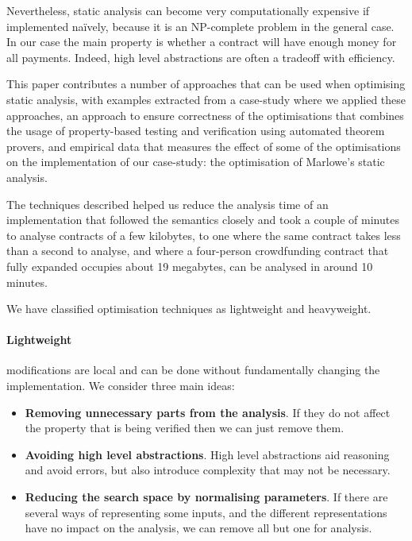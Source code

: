 \documentclass[english,runningheads]{llncs}
\begin{document}
Nevertheless, static analysis can become very computationally expensive if
implemented naïvely, because it is an NP-complete problem in the general case.
In our case the main property is whether a contract will have enough money for all payments. Indeed, high level abstractions are often a tradeoff with efficiency.


This paper contributes a number of approaches that can be used when
optimising static analysis, with examples extracted from a case-study where
we applied these approaches, an approach to ensure correctness
of the optimisations that combines the usage of property-based testing
and verification using automated theorem provers, and empirical data
that measures the effect of some of the optimisations on the implementation
of our case-study: the optimisation of Marlowe's static analysis.

The techniques described helped us reduce the analysis time of an implementation
that followed the semantics closely and took a couple of minutes to analyse contracts
of a few kilobytes, to one where the same contract takes less
than a second to analyse, and where a four-person crowdfunding contract that
fully expanded occupies about 19 megabytes, can be analysed in
around 10 minutes.

We have classified optimisation techniques as lightweight and heavyweight. 

\paragraph*{Lightweight}

modifications are local and can be done without fundamentally changing
the implementation. We consider three main ideas:
\begin{itemize}
\item \textbf{Removing unnecessary parts from the analysis}. If they do not affect
the property that is being verified then we can just remove them.
\item \textbf{Avoiding high level abstractions}. High level abstractions aid reasoning
and avoid errors, but also introduce complexity that may not be necessary.
\item \textbf{Reducing the search space by normalising parameters}. If there are several
ways of representing some inputs, and the different representations
have no impact on the analysis, we can remove all but one for analysis.
\end{itemize}
\end{document}
